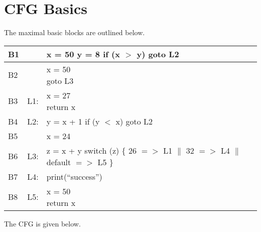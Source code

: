 \section{CFG Basics}

The maximal basic blocks are outlined below. 


\begin{table}[!ht]
\centering
\begin{tabular}{| l | l l |}
\hline
B1 & & \shortstack[l]{x = 50 \\ y = 8 \\ if (x $>$ y) goto L2} \\
\hline
B2 & & \shortstack[l]{x = 50 \\ goto L3} \\
\hline
B3 & L1: & \shortstack[l]{x = 27 \\ return x}\\
\hline
B4 & L2: & \shortstack[l]{y = x + 1 \\ if (y $<$ x) goto L2}\\
\hline
B5 &  & x = 24\\
\hline
B6 & L3: & \shortstack[l]{z = x + y \\ switch (z) \{ 26 $=>$ L1 $\|$ 32 $=>$ L4 $\|$ default $=>$ L5 \} } \\
\hline
B7 & L4: & print(``success'') \\
\hline
B8 & L5: & \shortstack[l]{x = 50\\return x}\\
\hline
\end{tabular}
\end{table}

The CFG is given below.

